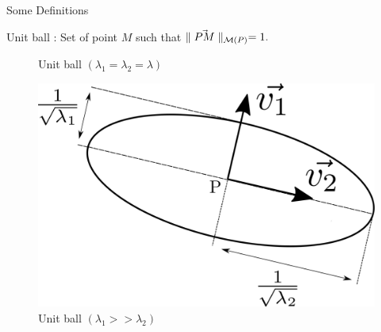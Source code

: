 \begin{frame}{Some Definitions}
{\begin{block}{Unit ball : Set of point $M$ such that $\parallel \vec{PM} \parallel_{\mathcal{M}(P)} = 1.$}
\begin{multicols}{2}
\begin{figure}[!htbp]
\vspace{0.2cm}
\caption*{\tiny{Unit ball $(\lambda_1 = \lambda_2 = \lambda)$}}
\label{ellipse_iso_triangle}
\end{figure}
            \columnbreak
           \begin{figure}[!htbp]
\centering
\includegraphics[scale=0.028]{image/ellipse_aniso.pdf}
\vspace{-0.3cm}
\caption*{\tiny{Unit ball $(\lambda_1 >> \lambda_2)$}}
\label{ellipse_iso_triangle}
     \end{figure}
 \end{multicols}
  \end{block}
  }
\end{frame}





